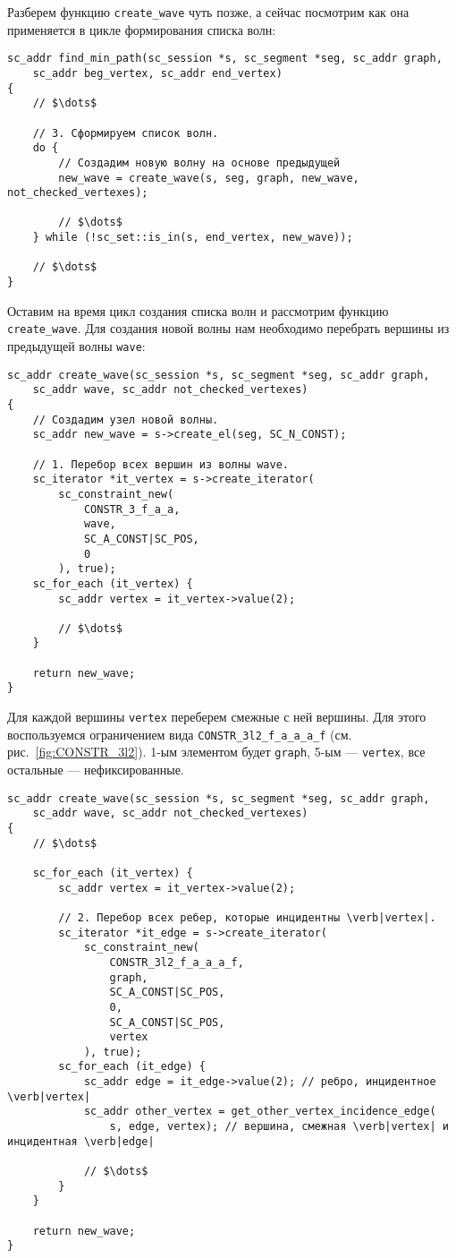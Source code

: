 Разберем функцию \lstinline|create_wave| чуть позже, а сейчас
посмотрим как она применяется в цикле формирования списка волн:
\begin{lstlisting}[texcl]
sc_addr find_min_path(sc_session *s, sc_segment *seg, sc_addr graph,
    sc_addr beg_vertex, sc_addr end_vertex)
{
    // $\dots$

    // 3. Сформируем список волн.
    do {
        // Создадим новую волну на основе предыдущей
        new_wave = create_wave(s, seg, graph, new_wave, not_checked_vertexes);

        // $\dots$
    } while (!sc_set::is_in(s, end_vertex, new_wave));

    // $\dots$
}
\end{lstlisting}

Оставим на время цикл создания списка волн и рассмотрим функцию
\lstinline|create_wave|. Для создания новой волны нам необходимо
перебрать вершины из предыдущей волны \lstinline|wave|:
\begin{lstlisting}[texcl]
sc_addr create_wave(sc_session *s, sc_segment *seg, sc_addr graph,
    sc_addr wave, sc_addr not_checked_vertexes)
{
    // Создадим узел новой волны.
    sc_addr new_wave = s->create_el(seg, SC_N_CONST);

    // 1. Перебор всех вершин из волны wave.
    sc_iterator *it_vertex = s->create_iterator(
        sc_constraint_new(
            CONSTR_3_f_a_a,
            wave,
            SC_A_CONST|SC_POS,
            0
        ), true);
    sc_for_each (it_vertex) {
        sc_addr vertex = it_vertex->value(2);

        // $\dots$
    }

    return new_wave;
}
\end{lstlisting}

Для каждой вершины \lstinline|vertex| переберем смежные с ней
вершины. Для этого воспользуемся ограничением вида
\lstinline|CONSTR_3l2_f_a_a_a_f| (см. рис.~\ref{fig:CONSTR_3l2}). 1-ым
элементом будет \lstinline|graph|, 5-ым --- \lstinline|vertex|, все
остальные --- нефиксированные.
\begin{lstlisting}[texcl]
sc_addr create_wave(sc_session *s, sc_segment *seg, sc_addr graph,
    sc_addr wave, sc_addr not_checked_vertexes)
{
    // $\dots$

    sc_for_each (it_vertex) {
        sc_addr vertex = it_vertex->value(2);

        // 2. Перебор всех ребер, которые инцидентны \verb|vertex|.
        sc_iterator *it_edge = s->create_iterator(
            sc_constraint_new(
                CONSTR_3l2_f_a_a_a_f,
                graph,
                SC_A_CONST|SC_POS,
                0,
                SC_A_CONST|SC_POS,
                vertex
            ), true);
        sc_for_each (it_edge) {
            sc_addr edge = it_edge->value(2); // ребро, инцидентное  \verb|vertex|
            sc_addr other_vertex = get_other_vertex_incidence_edge(
                s, edge, vertex); // вершина, смежная \verb|vertex| и инцидентная \verb|edge|

            // $\dots$
        }
    }

    return new_wave;
}
\end{lstlisting}

